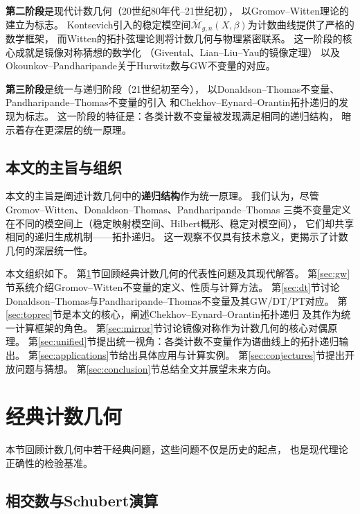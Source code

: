 \documentclass[11pt,a4paper]{article}
\theoremstyle{plain}
\theoremstyle{definition}
\newcommand{\Qbar}{\overline{\mathcal{M}}}
\begin{document}
\textbf{第二阶段}是现代计数几何（20世纪80年代--21世纪初），
以Gromov--Witten理论的建立为标志。
Kontsevich引入的稳定模空间$\Qbar_{g,n}(X,\beta)$为计数曲线提供了严格的数学框架，
而Witten的拓扑弦理论则将计数几何与物理紧密联系。
这一阶段的核心成就是镜像对称猜想的数学化
（Givental、Lian--Liu--Yau的镜像定理）
以及Okounkov--Pandharipande关于Hurwitz数与GW不变量的对应。

\textbf{第三阶段}是统一与递归阶段（21世纪初至今），
以Donaldson--Thomas不变量、Pandharipande--Thomas不变量的引入
和Chekhov--Eynard--Orantin拓扑递归的发现为标志。
这一阶段的特征是：各类计数不变量被发现满足相同的递归结构，
暗示着存在更深层的统一原理。

\subsection{本文的主旨与组织}

本文的主旨是阐述计数几何中的\textbf{递归结构}作为统一原理。
我们认为，尽管Gromov--Witten、Donaldson--Thomas、Pandharipande--Thomas
三类不变量定义在不同的模空间上（稳定映射模空间、Hilbert概形、稳定对模空间），
它们却共享相同的递归生成机制——拓扑递归。
这一观察不仅具有技术意义，更揭示了计数几何的深层统一性。

本文组织如下。
第\ref{sec:classical}节回顾经典计数几何的代表性问题及其现代解答。
第\ref{sec:gw}节系统介绍Gromov--Witten不变量的定义、性质与计算方法。
第\ref{sec:dt}节讨论Donaldson--Thomas与Pandharipande--Thomas不变量及其GW/DT/PT对应。
第\ref{sec:toprec}节是本文的核心，阐述Chekhov--Eynard--Orantin拓扑递归
及其作为统一计算框架的角色。
第\ref{sec:mirror}节讨论镜像对称作为计数几何的核心对偶原理。
第\ref{sec:unified}节提出统一视角：各类计数不变量作为谱曲线上的拓扑递归输出。
第\ref{sec:applications}节给出具体应用与计算实例。
第\ref{sec:conjectures}节提出开放问题与猜想。
第\ref{sec:conclusion}节总结全文并展望未来方向。


\section{经典计数几何}\label{sec:classical}

本节回顾计数几何中若干经典问题，这些问题不仅是历史的起点，
也是现代理论正确性的检验基准。

\subsection{相交数与Schubert演算}
\end{document}

